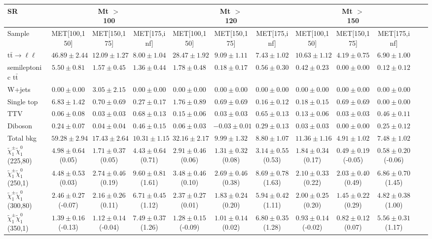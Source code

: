 \begin{table}
\begin{center}
\small
\begin{tabular}{lccccccccccc}
\hline
SR & & Mt $>$ 100 & & & Mt $>$ 120 & & &Mt $>$ 150 & & &\\
\hline
Sample&MET[100,150]&MET[150,175]&MET[175,inf]&MET[100,150]&MET[150,175]&MET[175,inf]&MET[100,150]&MET[150,175]&MET[175,inf]&\\
\hline
$\mathrm{t}\bar{\mathrm{t}}\rightarrow \ell\ell$&$46.89\pm2.44$&$12.09\pm1.27$&$8.00\pm1.04$&$28.47\pm1.92$&$9.09\pm1.11$&$7.43\pm1.02$&$10.63\pm1.12$&$4.19\pm0.75$&$6.90\pm1.00$\\
semileptonic $\mathrm{t}\bar{\mathrm{t}}$&$5.50\pm0.81$&$1.57\pm0.45$&$1.36\pm0.44$&$1.78\pm0.48$&$0.18\pm0.17$&$0.56\pm0.30$&$0.42\pm0.23$&$0.00\pm0.00$&$0.12\pm0.12$\\
W+jets&$0.00\pm0.00$&$3.05\pm2.15$&$0.00\pm0.00$&$0.00\pm0.00$&$0.00\pm0.00$&$0.00\pm0.00$&$0.00\pm0.00$&$0.00\pm0.00$&$0.00\pm0.00$\\
Single top&$6.83\pm1.42$&$0.70\pm0.69$&$0.27\pm0.17$&$1.76\pm0.89$&$0.69\pm0.69$&$0.16\pm0.12$&$0.18\pm0.15$&$0.69\pm0.69$&$0.00\pm0.00$\\
TTV&$0.06\pm0.08$&$0.03\pm0.03$&$0.68\pm0.13$&$0.15\pm0.06$&$0.03\pm0.03$&$0.65\pm0.13$&$0.13\pm0.06$&$0.03\pm0.03$&$0.46\pm0.11$\\
Diboson&$0.24\pm0.07$&$0.04\pm0.04$&$0.46\pm0.15$&$0.06\pm0.03$&$-0.03\pm0.01$&$0.29\pm0.13$&$0.03\pm0.03$&$0.00\pm0.00$&$0.25\pm0.12$\\
\hline
Total bkg&$59.28\pm2.94$&$17.43\pm2.64$&$10.31\pm1.15$&$32.16\pm2.17$&$9.99\pm1.32$&$8.80\pm1.07$&$11.36\pm1.16$&$4.91\pm1.02$&$7.48\pm1.02$\\
$\tilde{\chi}_{1}^{\pm}\tilde{\chi}_{1}^{0}$ (225,80)&$4.98\pm0.64$(0.05)&$1.71\pm0.37$(0.05)&$4.43\pm0.64$(0.71)&$2.91\pm0.46$(0.06)&$1.31\pm0.32$(0.08)&$3.14\pm0.55$(0.53)&$1.84\pm0.34$(0.17)&$0.49\pm0.19$(-0.05)&$0.58\pm0.20$(-0.06)\\
$\tilde{\chi}_{1}^{\pm}\tilde{\chi}_{1}^{0}$ (250,1)&$4.48\pm0.53$(0.03)&$2.74\pm0.46$(0.19)&$9.60\pm0.81$(1.61)&$3.48\pm0.46$(0.10)&$2.69\pm0.46$(0.38)&$8.69\pm0.78$(1.63)&$2.10\pm0.33$(0.22)&$2.03\pm0.40$(0.49)&$6.86\pm0.70$(1.45)\\
$\tilde{\chi}_{1}^{\pm}\tilde{\chi}_{1}^{0}$ (300,80)&$2.46\pm0.27$(-0.07)&$2.16\pm0.26$(0.11)&$6.71\pm0.45$(1.12)&$2.37\pm0.27$(0.01)&$1.83\pm0.24$(0.20)&$5.94\pm0.42$(1.11)&$2.00\pm0.25$(0.20)&$1.45\pm0.22$(0.29)&$4.82\pm0.38$(1.00)\\
$\tilde{\chi}_{1}^{\pm}\tilde{\chi}_{1}^{0}$ (350,1)&$1.39\pm0.16$(-0.13)&$1.12\pm0.14$(-0.04)&$7.49\pm0.37$(1.26)&$1.28\pm0.15$(-0.09)&$1.01\pm0.14$(0.02)&$6.80\pm0.35$(1.28)&$0.93\pm0.14$(-0.02)&$0.82\pm0.12$(0.07)&$5.56\pm0.31$(1.17)\\
\hline
\hline\hline
\end{tabular}
\end{center}
\end{table}
